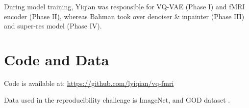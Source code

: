 \documentclass{article}
\theoremstyle{plain}
\theoremstyle{definition}
\theoremstyle{remark}
\begin{document}
During model training, Yiqian was responsible for VQ-VAE (Phase I) and fMRI encoder (Phase II), whereas Bahman took over denoiser \& inpainter (Phase III) and super-res model (Phase IV).


\section*{Code and Data}

Code is available at: \url{https://github.com/lyiqian/vq-fmri}

Data used in the reproducibility challenge is ImageNet, and GOD dataset \cite{horikawa2016}.

%
%





\end{document}
